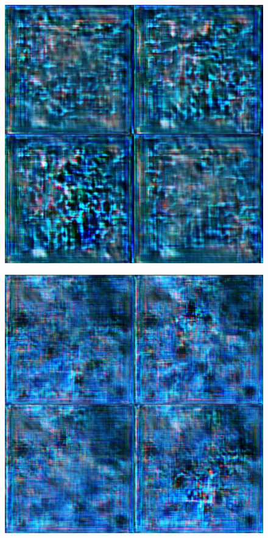 \begin{figure}[H]
\begin{minipage}{0.24\columnwidth}
		\label{fig:}
	\end{minipage}
	\begin{minipage}{0.24\columnwidth}
		\centering
		\includegraphics[clip, width=\linewidth]{fig/generative_adversarial_nets/0641_0000}
		\label{fig:}
	\end{minipage}
	\begin{minipage}{0.24\columnwidth}
		\centering
		\includegraphics[clip, width=\linewidth]{fig/generative_adversarial_nets/0969_0000}

\end{minipage}
\end{figure}
